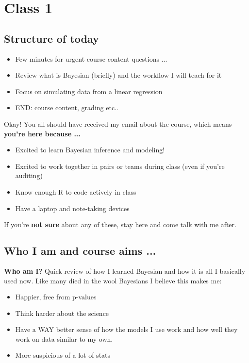 \documentclass[11pt]{article}
\begin{document}

\renewcommand{\refname}{\CHead{}}

\section{Class 1} 

\subsection{Structure of today}
\begin{itemize}
\item Few minutes for urgent course content questions ... 
\item Review what is Bayesian (briefly) and the workflow I will teach for it
\item Focus on simulating data from a linear regression
\item END: course content, grading etc..
\end{itemize}
Okay! You all should have received my email about the course, which means\\ {\bf you're here because ... }
\begin{itemize}
\item Excited to learn Bayesian inference and modeling!
\item Excited to work together in pairs or teams during class (even if you're auditing)
\item Know enough R to code actively in class 
\item Have a laptop and note-taking devices
\end{itemize}
If you're {\bf not sure} about any of these, stay here and come talk with me after. 

\subsection{Who I am and course aims ...}

{\bf Who am I?} Quick review of how I learned Bayesian and how it is all I basically used now. Like many died in the wool Bayesians I believe this makes me: 
\begin{itemize}
\item Happier, free from p-values
\item Think harder about the science
\item Have a WAY better sense of how the models I use work and how well they work on data similar to my own. 
\item More suspicious of a lot of stats
\end{itemize}
\end{document}
